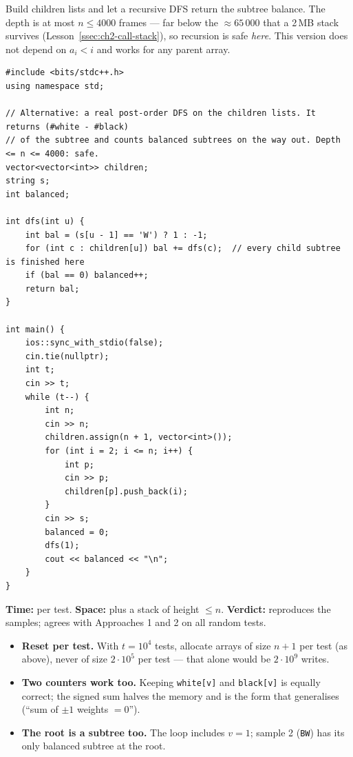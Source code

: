\begin{alternativebox}
Build children lists and let a recursive DFS return the subtree balance. The depth is at most $n \le 4000$ frames --- far below the $\approx 65\,000$ that a 2\,MB stack survives (Lesson~\ref{ssec:ch2-call-stack}), so recursion is safe \emph{here}. This version does not depend on $a_i < i$ and works for any parent array.

\begin{lstlisting}[style=cpp]
#include <bits/stdc++.h>
using namespace std;

// Alternative: a real post-order DFS on the children lists. It returns (#white - #black)
// of the subtree and counts balanced subtrees on the way out. Depth <= n <= 4000: safe.
vector<vector<int>> children;
string s;
int balanced;

int dfs(int u) {
    int bal = (s[u - 1] == 'W') ? 1 : -1;
    for (int c : children[u]) bal += dfs(c);  // every child subtree is finished here
    if (bal == 0) balanced++;
    return bal;
}

int main() {
    ios::sync_with_stdio(false);
    cin.tie(nullptr);
    int t;
    cin >> t;
    while (t--) {
        int n;
        cin >> n;
        children.assign(n + 1, vector<int>());
        for (int i = 2; i <= n; i++) {
            int p;
            cin >> p;
            children[p].push_back(i);
        }
        cin >> s;
        balanced = 0;
        dfs(1);
        cout << balanced << "\n";
    }
}
\end{lstlisting}
\begin{complexitybox}
\textbf{Time:}  per test. \textbf{Space:}  plus a stack of height $\le n$. \textbf{Verdict:} reproduces the samples; agrees with Approaches 1 and 2 on all random tests.
\end{complexitybox}
\end{alternativebox}

\begin{tricksbox}
\begin{itemize}[leftmargin=*]
    \item \textbf{Reset per test.} With $t = 10^4$ tests, allocate arrays of size $n + 1$ per test (as above), never of size $2\cdot10^5$ per test --- that alone would be $2\cdot10^9$ writes.
    \item \textbf{Two counters work too.} Keeping \texttt{white[v]} and \texttt{black[v]} is equally correct; the signed sum halves the memory and is the form that generalises (``sum of $\pm1$ weights $= 0$'').
    \item \textbf{The root is a subtree too.} The loop includes $v = 1$; sample 2 (\texttt{BW}) has its only balanced subtree at the root.
\end{itemize}
\end{tricksbox}

